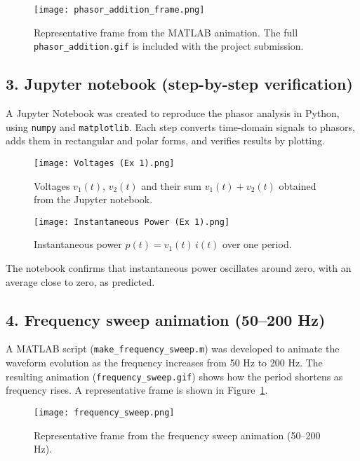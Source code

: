 \documentclass{article}
\begin{document}
\begin{figure}[H]
    \centering
    \texttt{[image: phasor\_addition\_frame.png]}
    \caption{Representative frame from the MATLAB animation. The full
    \texttt{phasor\_addition.gif} is included with the project submission.}
\end{figure}

\subsection*{3. Jupyter notebook (step-by-step verification)}

A Jupyter Notebook was created to reproduce the phasor analysis in Python, using \texttt{numpy} and \texttt{matplotlib}.
Each step converts time-domain signals to phasors, adds them in rectangular and polar forms, and verifies results by plotting.

\begin{figure}[H]
    \centering
    \texttt{[image: Voltages (Ex 1).png]}
    \caption{Voltages \(v_1(t)\), \(v_2(t)\) and their sum \(v_1(t)+v_2(t)\) obtained from the Jupyter notebook.}
\end{figure}

\begin{figure}[H]
    \centering
    \texttt{[image: Instantaneous Power (Ex 1).png]}
    \caption{Instantaneous power \(p(t) = v_1(t)\,i(t)\) over one period.}
\end{figure}

The notebook confirms that instantaneous power oscillates around zero, with an average close to zero, as predicted.


\subsection*{4. Frequency sweep animation (50–200 Hz)}
A MATLAB script (\texttt{make\_frequency\_sweep.m}) was developed to animate the
waveform evolution as the frequency increases from 50 Hz to 200 Hz.
The resulting animation (\texttt{frequency\_sweep.gif}) shows how the
period shortens as frequency rises. A representative frame is shown in
Figure~\ref{fig:sweep}.

\begin{figure}[H]
  \centering
  \texttt{[image: frequency\_sweep.png]}
  \caption{Representative frame from the frequency sweep animation (50–200 Hz).}
  \label{fig:sweep}
\end{figure}
\end{document}
